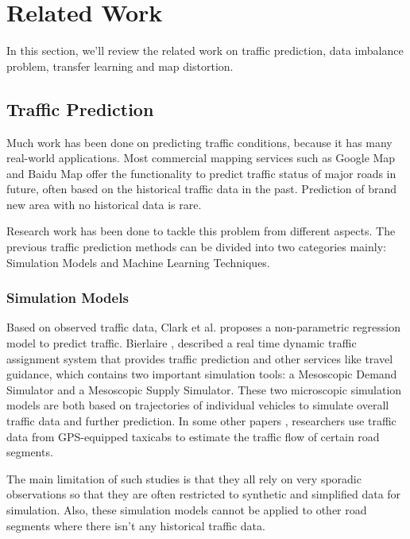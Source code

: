 \section{Related Work}
\label{sec:related}

In this section, we'll review the related work on traffic prediction, data imbalance problem, transfer learning and map distortion.

\subsection{Traffic Prediction}

Much work has been done on predicting traffic conditions, because 
it has many real-world applications. Most commercial mapping services
such as Google Map and Baidu Map offer the functionality 
to predict traffic status of major roads in future, often based on
the historical traffic data in the past.  Prediction of brand new
area with no historical data is rare.
	
Research work has been done to tackle this problem from 
different aspects. The previous traffic prediction methods 
can be divided into two categories mainly: 
Simulation Models and Machine Learning Techniques. 

\subsubsection*{Simulation Models} 
Based on observed traffic data, Clark
et al.\cite{Clark2003Traffic} proposes a non-parametric regression 
model to predict traffic. Bierlaire \cite{Bierlaire1998DynaMIT}, 
described a real time dynamic traffic assignment system 
that provides traffic prediction and other services like travel 
guidance, which contains two important simulation tools: 
a Mesoscopic Demand Simulator and a Mesoscopic Supply Simulator. 
These two microscopic simulation models are both based on 
trajectories of individual vehicles to simulate overall 
traffic data and further prediction. In some other papers 
\cite{KDD2011Driving}, researchers use traffic data from 
GPS-equipped taxicabs to estimate the traffic flow of 
certain road segments.
	
The main limitation of such studies is that they all rely on 
very sporadic observations so that they are often restricted 
to synthetic and simplified data for simulation. 
Also, these simulation models cannot be applied to other 
road segments where there isn't any historical traffic data.
	 

